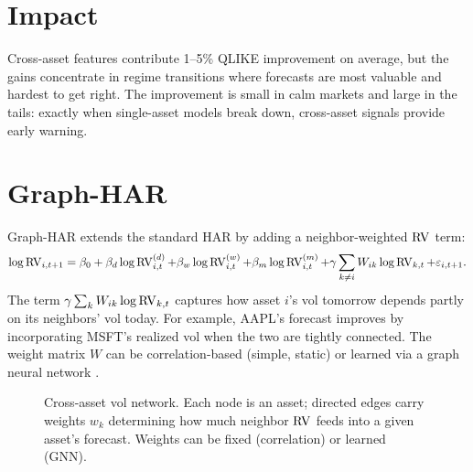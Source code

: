 \section{Impact}
\label{sec:cross-asset-impact}

Cross-asset features contribute 1--5\% QLIKE improvement on average, but the gains concentrate in regime transitions where forecasts are most valuable and hardest to get right.
The improvement is small in calm markets and large in the tails: exactly when single-asset models break down, cross-asset signals provide early warning.


\section{Graph-HAR}
\label{sec:graph-har}

Graph-HAR extends the standard HAR by adding a neighbor-weighted $\operatorname{RV}$ term:
\begin{equation}
\label{eq:graph-har}
\log \operatorname{RV}_{i,t+1} = \beta_0 + \beta_d \log \operatorname{RV}_{i,t}^{(d)} + \beta_w \log \operatorname{RV}_{i,t}^{(w)} + \beta_m \log \operatorname{RV}_{i,t}^{(m)} + \gamma \sum_{k \neq i} W_{ik} \log \operatorname{RV}_{k,t} + \varepsilon_{i,t+1}.
\end{equation}
The term $\gamma \sum_k W_{ik} \log \operatorname{RV}_{k,t}$ captures how asset $i$'s vol tomorrow depends partly on its neighbors' vol today.
For example, AAPL's forecast improves by incorporating MSFT's realized vol when the two are tightly connected.
The weight matrix $W$ can be correlation-based (simple, static) or learned via a graph neural network \citep{ZhangCucuringuDong2023}.

\begin{figure}[htbp]
\centering
{}
\caption{Cross-asset vol network. Each node is an asset; directed edges carry weights $w_k$ determining how much neighbor $\operatorname{RV}$ feeds into a given asset's forecast. Weights can be fixed (correlation) or learned (GNN).}
\label{fig:vol-network}
\end{figure}

